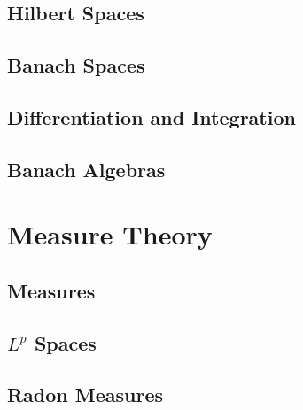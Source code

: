 \documentclass[12pt, a4paper, oneside, openright, titlepage]{book}
\begin{document}
\chapter{Hilbert Spaces}


\chapter{Banach Spaces}



\chapter{Differentiation and Integration}


\chapter{Banach Algebras}


\part{Measure Theory}

\chapter{Measures}

\chapter{\texorpdfstring{$L^p$ Spaces}{}}

\chapter{Radon Measures}
\end{document}
